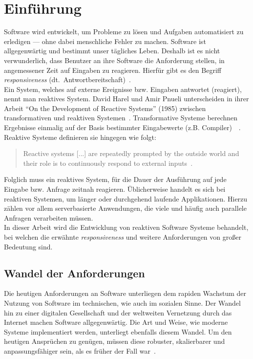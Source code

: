 \chapter{Einführung}\label{sec:einfuehrung}
Software wird entwickelt, um Probleme zu lösen und Aufgaben automatisiert zu erledigen --- ohne dabei menschliche Fehler zu machen. Software ist allgegenwärtig und bestimmt unser tägliches Leben. Deshalb ist es nicht verwunderlich, dass Benutzer an ihre Software die Anforderung stellen, in angemessener Zeit auf Eingaben zu reagieren. Hierfür gibt es den Begriff \textit{responsiveness} (dt.\ Antwortbereitschaft)~\cite[S.~18]{kuhn_reactive_2015}.\\
Ein System, welches auf externe Ereignisse bzw. Eingaben antwortet (reagiert), nennt man reaktives System. David Harel und Amir Pnueli unterscheiden in ihrer Arbeit \enquote{On the Development of Reactive Systems} (1985) zwischen transformativen und reaktiven Systemen~\cite{harel_development_1985}. Transformative Systeme berechnen Ergebnisse einmalig auf der Basis bestimmter Eingabewerte (z.B. Compiler)~\cite[S.~2]{carkci_dataflow_2014}~\cite{wieringa_design_2003}. Reaktive Systeme definieren sie hingegen wie folgt:

\begin{quotation}
  Reactive systems [...] are repeatedly prompted by the outside world and their role is to continuously respond to external inputs~\cite{harel_development_1985}.
\end{quotation}

Folglich muss ein reaktives System, für die Dauer der Ausführung auf jede Eingabe bzw. Anfrage zeitnah reagieren. Üblicherweise handelt es sich bei reaktiven Systemen, um länger oder durchgehend laufende Applikationen. Hierzu zählen vor allem serverbasierte Anwendungen, die viele und häufig auch parallele Anfragen verarbeiten müssen.\\
In dieser Arbeit wird die Entwicklung von reaktiven Software Systeme behandelt, bei welchen die erwähnte \textit{responsiveness} und weitere Anforderungen von großer Bedeutung sind.

\pagebreak

\section{Wandel der Anforderungen}
Die heutigen Anforderungen an Software unterliegen dem rapiden Wachstum der Nutzung von Software im technischen, wie auch im sozialen Sinne. Der Wandel hin zu einer digitalen Gesellschaft und der weltweiten Vernetzung durch das Internet machen Software allgegenwärtig. Die Art und Weise, wie moderne Systeme implementiert werden, unterliegt ebenfalls diesem Wandel. Um den heutigen Ansprüchen zu genügen, müssen diese robuster, skalierbarer und anpassungsfähiger sein, als es früher der Fall war~\cite{boner_reactive_2014}.\\

